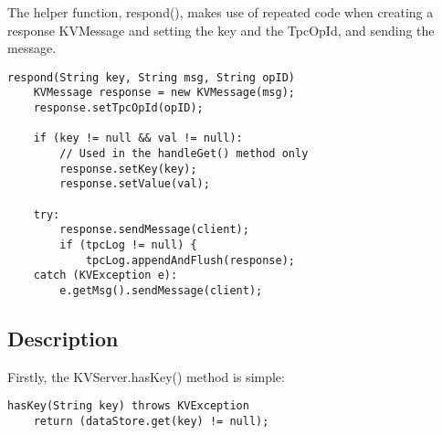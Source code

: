 \documentclass{article}
\begin{document}
The helper function, respond(), makes use of repeated code when creating a response KVMessage and setting the key and the TpcOpId, and sending the message.
\begin{verbatim}
respond(String key, String msg, String opID)
    KVMessage response = new KVMessage(msg);
    response.setTpcOpId(opID);

    if (key != null && val != null):
        // Used in the handleGet() method only
        response.setKey(key);
        response.setValue(val);

    try:
        response.sendMessage(client);
        if (tpcLog != null) {
            tpcLog.appendAndFlush(response);
    catch (KVException e):
        e.getMsg().sendMessage(client);
\end{verbatim}


\subsection*{Description}
Firstly, the KVServer.hasKey() method is simple:
\begin{verbatim}
hasKey(String key) throws KVException
    return (dataStore.get(key) != null);
\end{verbatim}
\end{document}
